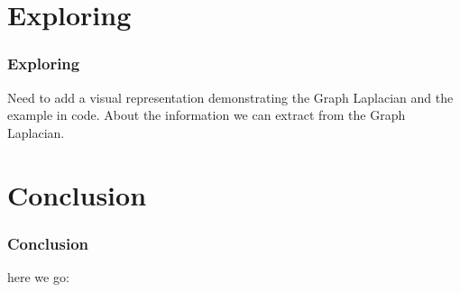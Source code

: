 \documentclass{beamer}
\begin{document}
\section{Exploring}
\begin{frame}
\frametitle{\textbf{Exploring} }

Need to add a visual representation demonstrating the Graph Laplacian and the example in code. About the information we can extract from the Graph Laplacian.

\end{frame}


\section{Conclusion}
\begin{frame}
\frametitle{Conclusion}

here we go: \vspace{0.2 cm}



\end{frame}




\end{document}
